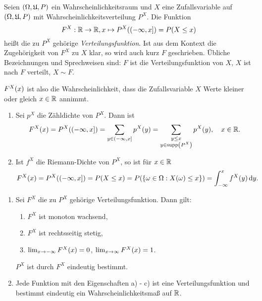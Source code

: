 \documentclass{lecture}
\begin{document}
    \begin{definition}
        Seien \(\parentheses*{\Omega, \mathfrak{U}, P}\) ein Wahrscheinlichkeitsraum und \(X\) eine Zufallsvariable auf \(\parentheses*{\Omega, \mathfrak{U}, P}\) mit Wahrscheinlichkeitsverteilung \(P^X\).
        Die Funktion
        \[
            F^X: \R \to \R, x \mapsto P^X\parentheses*{\left(-\infty, x\right]} = P\parentheses*{X \le x}
        \]
        heißt die zu \(P^X\) gehörige \emph{Verteilungsfunktion}.
        Ist aus dem Kontext die Zugehörigkeit von \(F^X\) zu \(X\) klar, so wird auch kurz \(F\) geschrieben.
        Übliche Bezeichnungen und Sprechweisen sind: \(F\) ist die Verteilungsfunktion von \(X\), \(X\) ist nach \(F\) verteilt, \(X \sim F\).
    \end{definition}

    \(F^X\parentheses*{x}\) ist also die Wahrscheinlichkeit, dass die Zufallsvariable \(X\) Werte kleiner oder gleich \(x \in \R\) annimmt.

    \begin{remark}
        \begin{enumerate}
            \item Sei \(p^X\) die Zähldichte von \(P^X\).
            Dann ist
            \[
                F^X\parentheses*{x} = P^X\parentheses*{\left(-\infty, x\right]} = \sum_{y \in \left(-\infty, x\right]}p^X\parentheses*{y} = \sum_{\substack{y \le x\\y \in \supp\parentheses*{P^X}}}p^X\parentheses*{y}, \quad x \in \R.
            \]
            \item Ist \(f^X\) die Riemann-Dichte von \(P^X\), so ist für \(x \in \R\)
            \[
                F^X\parentheses*{x} = P^X\parentheses*{\left(-\infty, x\right]} = P\parentheses*{X \le x} = P\parentheses*{\braces*{\omega \in \Omega : X\parentheses*{\omega} \le x}} = \int_{-\infty}^x f^X\parentheses*{y}\d y.
            \]
        \end{enumerate}
    \end{remark}

    \begin{lemma}
        \begin{enumerate}
            \item Sei \(F^X\) die zu \(P^X\) gehörige Verteilungsfunktion.
            Dann gilt:
            \begin{enumerate}
                \item \(F^X\) ist monoton wachsend,
                \item \(F^X\) ist rechtsseitig stetig,
                \item \(\lim_{x \to -\infty}F^X\parentheses*{x} = 0\), \(\lim_{x \to \infty}F^X\parentheses*{x} = 1\).
            \end{enumerate}
            \(P^X\) ist durch \(F^X\) eindeutig bestimmt.
            \item Jede Funktion mit den Eigenschaften a) - c) ist eine Verteilungsfunktion und bestimmt eindeutig ein Wahrscheinlichkeitsmaß auf \(\R\).
        \end{enumerate}
    \end{lemma}
\end{document}

